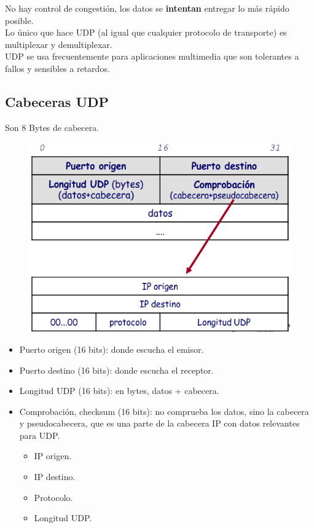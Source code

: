 No hay control de congestión, los datos se \textbf{intentan} entregar lo más rápido posible.\\ 

Lo único que hace UDP (al igual que cualquier protocolo de transporte) es multiplexar y demultiplexar.\\

UDP se usa frecuentemente para aplicaciones multimedia que son tolerantes a fallos y sensibles a retardos. 

\subsection{Cabeceras UDP}
Son 8 Bytes de cabecera. 
\begin{figure}[H]
    \centering
    \includegraphics[width=0.6\linewidth]{./images/cabecera-udp.png}
\end{figure}

\begin{itemize}
    \item Puerto origen (16 bits): donde escucha el emisor.
    \item Puerto destino (16 bits): donde escucha el receptor.
    \item Longitud UDP (16 bits): en bytes, datos + cabecera.
    \item Comprobación, checksum (16 bits): no comprueba los datos, sino la cabecera y pseudocabecera, que es una parte de la cabecera IP con datos relevantes para UDP.
        \begin{itemize}
            \item IP origen.
            \item IP destino.
            \item Protocolo.
            \item Longitud UDP.
        \end{itemize}
\end{itemize}

